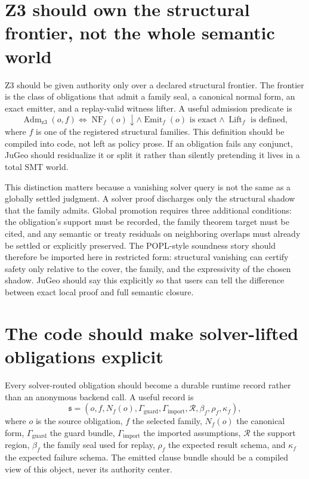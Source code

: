 \documentclass[11pt]{report}
\begin{document}
\section{Z3 should own the structural frontier, not the whole semantic world}
Z3 should be given authority only over a declared structural frontier. The frontier is the class of obligations that admit a family seal, a canonical normal form, an exact emitter, and a replay-valid witness lifter. A useful admission predicate is
\[
\operatorname{Adm}_{\mathrm{z3}}(o,f)
\iff
\operatorname{NF}_f(o)\downarrow
\land
\operatorname{Emit}_f(o)\text{ is exact}
\land
\operatorname{Lift}_f\text{ is defined},
\]
where $f$ is one of the registered structural families. This definition should be compiled into code, not left as policy prose. If an obligation fails any conjunct, JuGeo should residualize it or split it rather than silently pretending it lives in a total SMT world.

This distinction matters because a vanishing solver query is not the same as a globally settled judgment. A solver proof discharges only the structural shadow that the family admits. Global promotion requires three additional conditions: the obligation's support must be recorded, the family theorem target must be cited, and any semantic or treaty residuals on neighboring overlaps must already be settled or explicitly preserved. The POPL-style soundness story should therefore be imported here in restricted form: structural vanishing can certify safety only relative to the cover, the family, and the expressivity of the chosen shadow. JuGeo should say this explicitly so that users can tell the difference between exact local proof and full semantic closure.

\section{The code should make solver-lifted obligations explicit}
Every solver-routed obligation should become a durable runtime record rather than an anonymous backend call. A useful record is
\[
\mathfrak{s}
=
(o, f, N_f(o), \Gamma_{\mathrm{guard}}, \Gamma_{\mathrm{import}}, \mathcal{R}, \beta_f, \rho_f, \kappa_f),
\]
where $o$ is the source obligation, $f$ the selected family, $N_f(o)$ the canonical form, $\Gamma_{\mathrm{guard}}$ the guard bundle, $\Gamma_{\mathrm{import}}$ the imported assumptions, $\mathcal{R}$ the support region, $\beta_f$ the family seal used for replay, $\rho_f$ the expected result schema, and $\kappa_f$ the expected failure schema. The emitted clause bundle should be a compiled view of this object, never its authority center.
\end{document}
